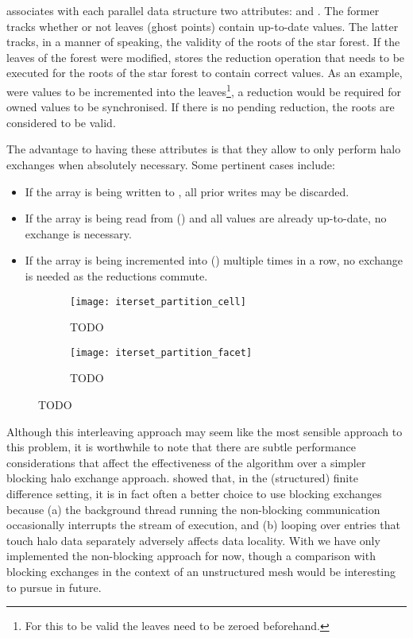 \documentclass[thesis]{subfiles}
\begin{document}
 associates with each parallel data structure two attributes:  and .
The former tracks whether or not leaves (ghost points) contain up-to-date values.
The latter tracks, in a manner of speaking, the validity of the roots of the star forest.
If the leaves of the forest were modified,  stores the reduction operation that needs to be executed for the roots of the star forest to contain correct values.
As an example, were values to be incremented into the leaves\footnote{For this to be valid the leaves need to be zeroed beforehand.}, a  reduction would be required for owned values to be synchronised.
If there is no pending reduction, the roots are considered to be valid.

The advantage to having these attributes is that they allow  to only perform halo exchanges when absolutely necessary.
Some pertinent cases include:

\begin{itemize}
  \item If the array is being written to , all prior writes may be discarded.
  \item If the array is being read from () and all values are already up-to-date, no exchange is necessary.
  \item If the array is being incremented into () multiple times in a row, no exchange is needed as the reductions commute.
\end{itemize}



\begin{figure}
  \begin{subfigure}{\textwidth}
    \texttt{[image: iterset\_partition\_cell]}
    \caption{TODO}
    \label{fig:iterset_partition_cell}
  \end{subfigure}
  \begin{subfigure}{\textwidth}
    \texttt{[image: iterset\_partition\_facet]}
    \caption{TODO}
    \label{fig:iterset_partition_facet}
  \end{subfigure}
  \caption{TODO}
  \label{fig:iterset_partition}
\end{figure}


Although this interleaving approach may seem like the most sensible approach to this problem, it is worthwhile to note that there are subtle performance considerations that affect the effectiveness of the algorithm over a simpler blocking halo exchange approach.
\cite{bisbasAutomatedMPICode2023} showed that, in the (structured) finite difference setting, it is in fact often a better choice to use blocking exchanges because
(a) the background thread running the non-blocking communication occasionally interrupts the stream of execution, and
(b) looping over entries that touch halo data separately adversely affects data locality.
With  we have only implemented the non-blocking approach for now, though a comparison with blocking exchanges in the context of an unstructured mesh would be interesting to pursue in future.
\end{document}
